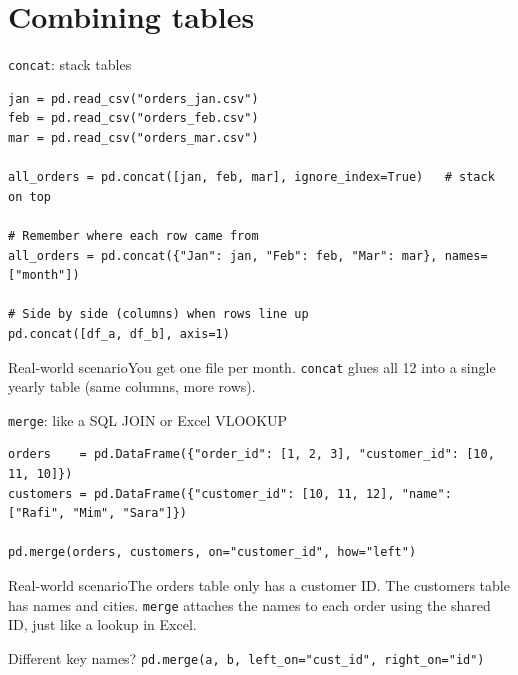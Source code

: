 \documentclass[aspectratio=169,10pt]{beamer}
\newcommand{\code}[1]{\texttt{#1}}
\newcommand{\scenario}[1]{\begin{exampleblock}{Real-world scenario}#1\end{exampleblock}}
\begin{document}
\section{Combining tables}

\begin{frame}[fragile]{\texttt{concat}: stack tables}
\begin{lstlisting}
jan = pd.read_csv("orders_jan.csv")
feb = pd.read_csv("orders_feb.csv")
mar = pd.read_csv("orders_mar.csv")

all_orders = pd.concat([jan, feb, mar], ignore_index=True)   # stack on top

# Remember where each row came from
all_orders = pd.concat({"Jan": jan, "Feb": feb, "Mar": mar}, names=["month"])

# Side by side (columns) when rows line up
pd.concat([df_a, df_b], axis=1)
\end{lstlisting}
  \scenario{You get one file per month. \code{concat} glues all 12 into a single yearly table
  (same columns, more rows).}
\end{frame}

\begin{frame}[fragile]{\texttt{merge}: like a SQL JOIN or Excel VLOOKUP}
\begin{lstlisting}
orders    = pd.DataFrame({"order_id": [1, 2, 3], "customer_id": [10, 11, 10]})
customers = pd.DataFrame({"customer_id": [10, 11, 12], "name": ["Rafi", "Mim", "Sara"]})

pd.merge(orders, customers, on="customer_id", how="left")
\end{lstlisting}
  \scenario{The orders table only has a customer ID. The customers table has names and
  cities. \code{merge} attaches the names to each order using the shared ID,
  just like a lookup in Excel.}
  \begin{block}{Different key names?}
    \code{pd.merge(a, b, left\_on="cust\_id", right\_on="id")}
  \end{block}
\end{frame}
\end{document}
